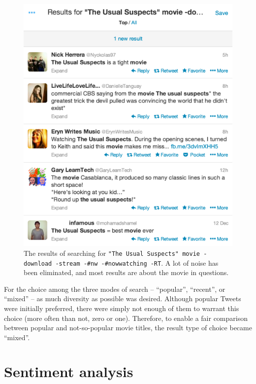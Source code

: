 \begin{figure}[h]
  \centering
    \includegraphics{Figures/search_filtered}
  \caption{The results of searching for \texttt{"The Usual Suspects" movie -download -stream -\#nw -\#nowwatching -RT}. A lot of noise has been eliminated, and most results are about the movie in questions.}
  \label{fig:search_filtered}
\end{figure}

For the choice among the three modes of search -- ``popular'', ``recent'', or ``mixed'' -- as much diversity as possible was desired. Although popular Tweets were initially preferred, there were simply not enough of them to warrant this choice (more often than not, zero or one). Therefore, to enable a fair comparison between popular and not-so-popular movie titles, the result type of choice became ``mixed''.


\section{Sentiment analysis} %
\label{sec:sentiment_analysis_impl}

